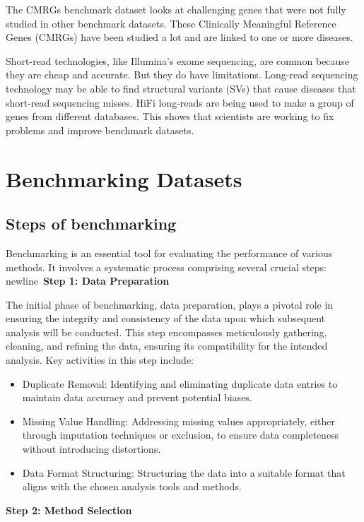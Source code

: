 The CMRGs benchmark dataset looks at challenging genes that were not fully studied in other benchmark datasets. These Clinically Meaningful Reference Genes (CMRGs) have been studied a lot and are linked to one or more diseases.

Short-read technologies, like Illumina's exome sequencing, are common because they are cheap and accurate. But they do have limitations. Long-read sequencing technology may be able to find structural variants (SVs) that cause diseases that short-read sequencing misses. HiFi long-reads are being used to make a group of genes from different databases. This shows that scientists are working to fix problems and improve benchmark datasets.

 





\chapter{Benchmarking Datasets}
\section{Steps of benchmarking}

Benchmarking is an essential tool for evaluating the performance of various methods. It involves a systematic process comprising several crucial steps:
newline\
\textbf{Step 1: Data Preparation}

The initial phase of benchmarking, data preparation, plays a pivotal role in ensuring the integrity and consistency of the data upon which subsequent analysis will be conducted. This step encompasses meticulously gathering, cleaning, and refining the data, ensuring its compatibility for the intended analysis. Key activities in this step include:

\begin{itemize}
    \item Duplicate Removal: Identifying and eliminating duplicate data entries to maintain data accuracy and prevent potential biases.
    \item Missing Value Handling: Addressing missing values appropriately, either through imputation techniques or exclusion, to ensure data completeness without introducing distortions.
    \item Data Format Structuring: Structuring the data into a suitable format that aligns with the chosen analysis tools and methods.
\end{itemize}
\textbf{Step 2: Method Selection}

